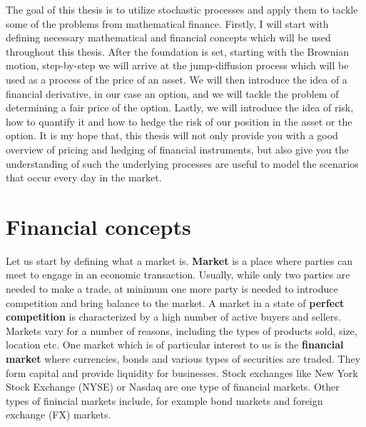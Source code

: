 \documentclass[times, utf8, diplomski]{fer}
\begin{document}
The goal of this thesis is to utilize stochastic processes and apply them to tackle some of the problems from mathematical finance. Firstly, I will start with defining necessary mathematical and financial concepts which will be used throughout this thesis. After the foundation is set, starting with the Brownian motion, step-by-step we will arrive at the jump-diffusion process which will be used as a process of the price of an asset. We will then introduce the idea of a financial derivative, in our case an option, and we will tackle the problem of determining a fair price of the option. Lastly, we will introduce the idea of risk, how to quantify it and how to hedge the risk of our position in the asset or the option. It is my hope that, this thesis will not only provide you with a good overview of pricing and hedging of financial instruments, but also give you the understanding of such the underlying processes are useful to model the scenarios that occur every day in the market.

\chapter{Financial concepts}
Let us start by defining what a market is. \textbf{Market} is a place where parties can meet to engage in an economic transaction. Usually, while only two parties are needed to make a trade, at minimum one more party is needed to introduce competition and bring balance to the market. A market in a state of \textbf{perfect competition} is characterized by a high number of active buyers and sellers. Markets vary for a number of reasons, including the types of products sold, size, location etc. One market which is of particular interest to us is the \textbf{financial market} where currencies, bonds and various types of securities are traded. They form capital and provide liquidity for businesses. Stock exchanges like New York Stock Exchange (NYSE) or Nasdaq are one type of financial markets. Other types of finincial markets include, for example bond markets and foreign exchange (FX) markets. 
\end{document}

